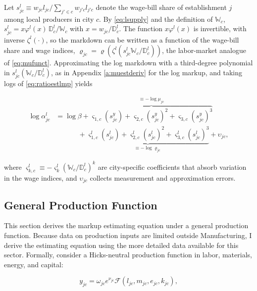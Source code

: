 Let $s^l_{jc} \equiv w_{jc} l_{jc} / \sum_{j' \in c} w_{j'c} l_{j'c}$ denote the wage-bill share of establishment $j$ among local producers in city $c$. By \eqref{eq:lsupply} and the definition of $\mathbb{W}_c$, $s^l_{jc} = x \varphi^l(x) \, \mathbb{D}^l_c/\mathbb{W}_c$ with $x = w_{jc}/\mathbb{D}^l_c$. The function $x \varphi^l(x)$ is invertible, with inverse $\zeta^l(\cdot)$, so the markdown can be written as a function of the wage-bill share and wage indices, $\varrho_{jc} = \varrho\left(\zeta^l\left(s^l_{jc} \mathbb{W}_c/\mathbb{D}^l_c\right)\right)$, the labor-market analogue of \eqref{eq:mufunct}. Approximating the log markdown with a third-degree polynomial in $s^l_{jc}(\mathbb{W}_c/\mathbb{D}^l_c)$, as in Appendix \ref{a:muestderiv} for the log markup, and taking logs of \eqref{eq:ratioestlmp} yields

\begin{align}
\log \alpha^l_{jc} & = \log \beta + \overbrace{\varsigma_{1,c} \left(s^y_{jc}\right) + \varsigma_{2,c} \left(s^y_{jc}\right)^2 + \varsigma_{3,c} \left(s^y_{jc}\right)^3}^{\equiv -\log \mu_{jc}} \nonumber \\
& \phantom{\log \beta} \;\;\; + \underbrace{\varsigma^l_{1,c} \left(s^l_{jc}\right) + \varsigma^l_{2,c} \left(s^l_{jc}\right)^2 + \varsigma^l_{3,c} \left(s^l_{jc}\right)^3}_{\equiv -\log \varrho_{jc}} + \upsilon_{jc}, \label{eq:estequlmp}
\end{align}

where $\varsigma^l_{k,c} \equiv -\varsigma^l_k \left(\mathbb{W}_c/\mathbb{D}^l_c\right)^k$ are city-specific coefficients that absorb variation in the wage indices, and $\upsilon_{jc}$ collects measurement and approximation errors.

\subsection{General Production Function}\label{a:genprodfn}
This section derives the markup estimating equation under a general production function. Because data on production inputs are limited outside Manufacturing, I derive the estimating equation using the more detailed data available for this sector. Formally, consider a Hicks-neutral production function in labor, materials, energy, and capital:

\begin{equation}\label{eq:genprodfn}
y_{jc} = \omega_{jc} e^{\nu_{jc}} \mathcal{F}\left(l_{jc}, m_{jc}, e_{jc}, k_{jc} \right),
\end{equation}

